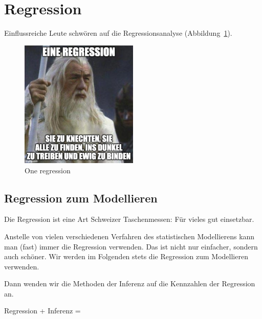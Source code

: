 \documentclass[
  a4paper,
  DIV=11]{scrreprt}
\theoremstyle{definition}
\theoremstyle{remark}
\begin{document}
\hypertarget{regression}{%
\section{Regression}\label{regression}}

Einflussreiche Leute schwören auf die Regressionsanalyse
(Abbildung~\ref{fig-gandalf}).

\begin{figure}

{\centering \includegraphics[width=0.5\textwidth,height=\textheight]{./img/einring.jpg}

}

\caption{\label{fig-gandalf}One regression}

\end{figure}

\hypertarget{regression-zum-modellieren}{%
\subsection{Regression zum
Modellieren}\label{regression-zum-modellieren}}

Die Regression ist eine Art Schweizer Taschenmessen: Für vieles gut
einsetzbar.

Anstelle von vielen verschiedenen Verfahren des statistischen
Modellierens kann man (fast) immer die Regression verwenden. Das ist
nicht nur einfacher, sondern auch schöner. Wir werden im Folgenden stets
die Regression zum Modellieren verwenden.

Dann wenden wir die Methoden der Inferenz auf die Kennzahlen der
Regression an.

\begin{tcolorbox}[enhanced jigsaw, title=\textcolor{quarto-callout-note-color}{\faInfo}\hspace{0.5em}{Hinweis}, bottomtitle=1mm, bottomrule=.15mm, titlerule=0mm, colbacktitle=quarto-callout-note-color!10!white, colframe=quarto-callout-note-color-frame, leftrule=.75mm, left=2mm, toprule=.15mm, colback=white, arc=.35mm, breakable, toptitle=1mm, opacityback=0, rightrule=.15mm, coltitle=black, opacitybacktitle=0.6]

Regression + Inferenz = 💖

\end{tcolorbox}
\end{document}
